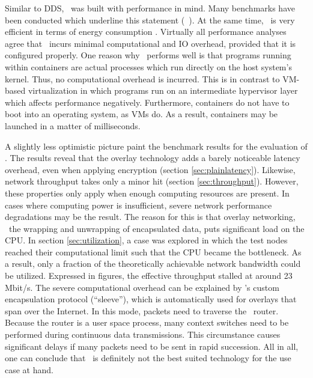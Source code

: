 Similar to DDS, \docker\ was built with performance in mind. Many benchmarks have been conducted which underline this statement (\eg\ \cite{felter2015updated,morabito2015hypervisors,adufu2015container,xavier2013performance}). At the same time, \docker\ is very efficient in terms of energy consumption \cite{morabito2015power}. Virtually all performance analyses agree that \docker\ incurs minimal computational and IO overhead, provided that it is configured properly. One reason why \docker\ performs well is that programs running within containers are actual processes which run directly on the host system's kernel. Thus, no computational overhead is incurred. This is in contrast to VM-based virtualization in which programs run on an intermediate hypervisor layer which affects performance negatively. Furthermore, containers do not have to boot into an operating system, as VMs do. As a result, containers may be launched in a matter of milliseconds.

A slightly less optimistic picture paint the benchmark results for the evaluation of \wnet . The results reveal that the overlay technology adds a barely noticeable latency overhead, even when applying encryption (\cf section \ref{sec:plainlatency}). Likewise, network throughput takes only a minor hit (\cf section \ref{sec:throughput}). However, these properties only apply when enough computing resources are present. In cases where computing power is insufficient, severe network performance degradations may be the result. The reason for this is that overlay networking, \ie\ the wrapping and unwrapping of encapsulated data, puts significant load on the CPU. In section \ref{sec:utilization}, a case was explored in which the test nodes reached their computational limit such that the CPU became the bottleneck. As a result, only a fraction of the theoretically achievable network bandwidth could be utilized. Expressed in figures, the effective throughput stalled at around 23 Mbit/s. The severe computational overhead can be explained by \weave 's custom encapsulation protocol (``sleeve''), which is automatically used for overlays that span over the Internet. In this mode, packets need to traverse the \weave\ router. Because the router is a user space process, many context switches need to be performed during continuous data transmissions. This circumstance causes significant delays if many packets need to be sent in rapid succession. All in all, one can conclude that \wnet\ is definitely not the best suited technology for the use case at hand.


